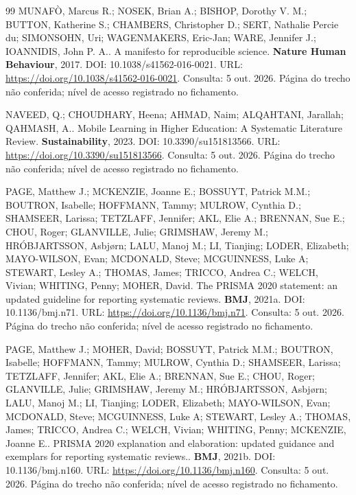 \begin{thebibliography}{99}
 MUNAFÒ, Marcus R.; NOSEK, Brian A.; BISHOP, Dorothy V. M.; BUTTON, Katherine S.; CHAMBERS, Christopher D.; SERT, Nathalie Percie du; SIMONSOHN, Uri; WAGENMAKERS, Eric-Jan; WARE, Jennifer J.; IOANNIDIS, John P. A.. A manifesto for reproducible science. \textbf{Nature Human Behaviour}, 2017. DOI: 10.1038/s41562-016-0021. URL: \url{https://doi.org/10.1038/s41562-016-0021}. Consulta: 5 out. 2026. Página do trecho não conferida; nível de acesso registrado no fichamento.


 NAVEED, Q.; CHOUDHARY, Heena; AHMAD, Naim; ALQAHTANI, Jarallah; QAHMASH, A.. Mobile Learning in Higher Education: A Systematic Literature Review. \textbf{Sustainability}, 2023. DOI: 10.3390/su151813566. URL: \url{https://doi.org/10.3390/su151813566}. Consulta: 5 out. 2026. Página do trecho não conferida; nível de acesso registrado no fichamento.


 PAGE, Matthew J.; MCKENZIE, Joanne E.; BOSSUYT, Patrick M.M.; BOUTRON, Isabelle; HOFFMANN, Tammy; MULROW, Cynthia D.; SHAMSEER, Larissa; TETZLAFF, Jennifer; AKL, Elie A.; BRENNAN, Sue E.; CHOU, Roger; GLANVILLE, Julie; GRIMSHAW, Jeremy M.; HRÓBJARTSSON, Asbjørn; LALU, Manoj M.; LI, Tianjing; LODER, Elizabeth; MAYO-WILSON, Evan; MCDONALD, Steve; MCGUINNESS, Luke A; STEWART, Lesley A.; THOMAS, James; TRICCO, Andrea C.; WELCH, Vivian; WHITING, Penny; MOHER, David. The PRISMA 2020 statement: an updated guideline for reporting systematic reviews. \textbf{BMJ}, 2021a. DOI: 10.1136/bmj.n71. URL: \url{https://doi.org/10.1136/bmj.n71}. Consulta: 5 out. 2026. Página do trecho não conferida; nível de acesso registrado no fichamento.


 PAGE, Matthew J.; MOHER, David; BOSSUYT, Patrick M.M.; BOUTRON, Isabelle; HOFFMANN, Tammy; MULROW, Cynthia D.; SHAMSEER, Larissa; TETZLAFF, Jennifer; AKL, Elie A.; BRENNAN, Sue E.; CHOU, Roger; GLANVILLE, Julie; GRIMSHAW, Jeremy M.; HRÓBJARTSSON, Asbjørn; LALU, Manoj M.; LI, Tianjing; LODER, Elizabeth; MAYO-WILSON, Evan; MCDONALD, Steve; MCGUINNESS, Luke A; STEWART, Lesley A.; THOMAS, James; TRICCO, Andrea C.; WELCH, Vivian; WHITING, Penny; MCKENZIE, Joanne E.. PRISMA 2020 explanation and elaboration: updated guidance and exemplars for reporting systematic reviews.. \textbf{BMJ}, 2021b. DOI: 10.1136/bmj.n160. URL: \url{https://doi.org/10.1136/bmj.n160}. Consulta: 5 out. 2026. Página do trecho não conferida; nível de acesso registrado no fichamento.



\end{thebibliography}
